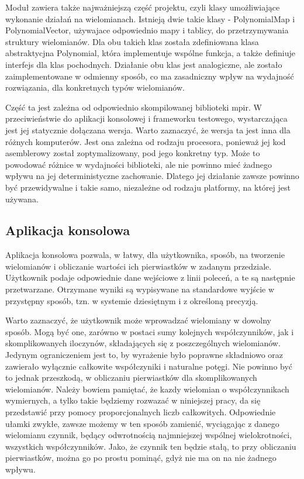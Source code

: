 \documentclass[twoside,a4paper]{book}
\begin{document}
Moduł zawiera także najważniejszą część projektu, czyli klasy umożliwiające wykonanie działań na wielomianach. Istnieją dwie takie klasy - PolynomialMap i PolynomialVector, używajace odpowiednio mapy i tablicy, do przetrzymywania struktury wielomianów. Dla obu takich klas została zdefiniowana klasa abstraktycjna Polynomial, która implementuje wspólne funkcja, a także definiuje interfejs dla klas pochodnych. Działanie obu klas jest analogiczne, ale zostało zaimplementowane w odmienny sposób, co ma zasadniczny wpływ na wydajność rozwiązania, dla konkretnych typów wielomianów.

Część ta jest zależna od odpowiednio skompilowanej biblioteki mpir. W przeciwieństwie do aplikacji konsolowej i frameworku testowego, wystarczająca jest jej statycznie dołączana wersja. Warto zaznaczyć, że wersja ta jest inna dla różnych komputerów. Jest ona zależna od rodzaju procesora, ponieważ jej kod asemblerowy został zoptymalizowany, pod jego konkretny typ. Może to powodować różnice w wydajności biblioteki, ale nie powinno mieć żadnego wpływu na jej deterministyczne zachowanie. Dlatego jej działanie zawsze powinno być przewidywalne i takie samo, niezależne od rodzaju platformy, na której jest używana.

\subsection{Aplikacja konsolowa}

Aplikacja konsolowa pozwala, w łatwy, dla użytkownika, sposób, na tworzenie wielomianów i obliczanie wartości ich pierwiastków w zadanym przedziale. Użytkownik podaje odpowiednie dane wejściowe z linii poleceń, a te są następnie przetwarzane. Otrzymane wyniki są wypisywane na standardowe wyjście w przystępny sposób, tzn. w systemie dziesiętnym i z określoną precyzją.

Warto zaznaczyć, że użytkownik może wprowadzać wielomiany w dowolny sposób. Mogą być one, zarówno w postaci sumy kolejnych współczynników, jak i skomplikowanych iloczynów, składających się z poszczególnych wielomianów. Jedynym ograniczeniem jest to, by wyrażenie było poprawne składniowo oraz zawierało wyłącznie całkowite współczyniki i naturalne potęgi. Nie powinno być to jednak przeszkodą, w obliczaniu pierwiastków dla skomplikowanych wielomianów. Należy bowiem pamiętać, że kazdy wielomian o współczynnikach wymiernych, a tylko takie będziemy rozwazać w niniejszej pracy, da się przedstawić przy pomocy proporcjonalnych liczb całkowitych. Odpowiednie ułamki zwykłe, zawsze możemy w ten sposób zamienić, wyciągając z danego wielomianu czynnik, będący odwrotnością najmniejszej wspólnej wielokrotności, wszystkich współczynników. Jako, że czynnik ten będzie stałą, to przy obliczaniu pierwiastków, można go po prostu pominąć, gdyż nie ma on na nie żadnego wpływu.
\end{document}
